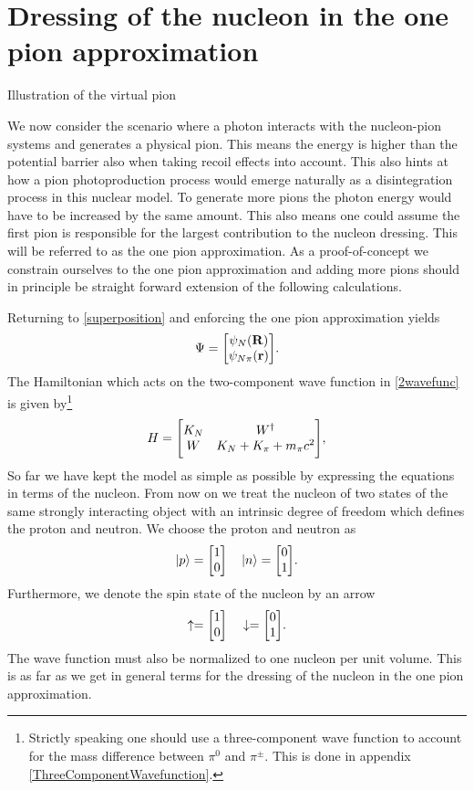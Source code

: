 \section{Dressing of the nucleon in the one pion approximation}\label{dressnuc}
\begin{marginfigure}
	\centering
	
	\caption{Illustration of the virtual pion}
	\label{fig:Underbarrier}
\end{marginfigure}
We now consider the scenario where a photon interacts with the nucleon-pion systems and generates a physical pion. This means the energy is higher than the potential barrier also when taking recoil effects into account. This also hints at how a pion photoproduction process would emerge naturally as a disintegration process in this nuclear model. To generate more pions the photon energy would have to be increased by the same amount. This also means one could assume the first pion is responsible for the largest contribution to the nucleon dressing.  This will be referred to as the one pion approximation.  As a proof-of-concept we constrain ourselves to the one pion approximation and adding more pions should in principle be straight forward extension of the following calculations.

Returning to \eqref{superposition} and enforcing the one pion approximation yields
\begin{equation} \label{2wavefunc}
	\Psi = \mqty[\psi_{N}(\vec{R})\\
	\psi_{N\pi}(\vec{r})].
\end{equation}
The Hamiltonian which acts on the two-component wave function in \eqref{2wavefunc} is given by\footnote{Strictly speaking one should use a three-component wave function to account for the mass difference between $\pi^0$ and $\pi^\pm$. This is done in appendix \ref{ThreeComponentWavefunction}.}
\begin{equation}\label{HamilTwo}
	H  =  \mqty[K_N & W^\dagger \\ W & K_N+K_\pi+m_\pi c^2],
\end{equation}
So far we have kept the model as simple as possible by expressing the equations in terms of the nucleon. From now on we treat the nucleon of two states of the same strongly interacting object with an intrinsic degree of freedom which defines the proton and neutron. We choose the proton and neutron as 
\begin{equation} \label{isospinvec}
	\ket{p} = \mqty[1 \\ 0 ] \quad \ket{n} = \mqty[0 \\ 1].
\end{equation} 
Furthermore, we denote the spin state of the nucleon by an arrow
\begin{equation} \label{spinvec}
	\uparrow = \mqty[1 \\ 0 ] \quad  \downarrow= \mqty[0 \\ 1].
\end{equation}
The wave function must also be normalized to one nucleon per unit volume. This is as far as we get in general terms for the dressing of the nucleon in the one pion approximation.
